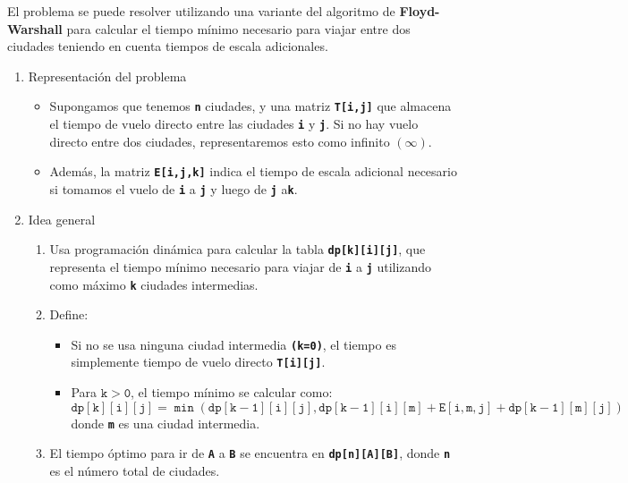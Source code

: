 \begin{enumerate}[label=\color{red}\textbf{\arabic*)}]
\begin{enumerate}[label=\color{red}\alph*)]
        El problema se puede resolver utilizando una variante del algoritmo de \textbf{Floyd-Warshall} para calcular el tiempo mínimo necesario para viajar entre dos ciudades teniendo en cuenta tiempos de escala adicionales.
        \begin{enumerate}[label=\arabic*)]
          \item Representación del problema
            \begin{itemize}[label=\textbullet]
              \item Supongamos que tenemos  \textbf{\texttt{n}} ciudades, y una matriz \textbf{\texttt{T[i,j]}} que almacena el tiempo de vuelo directo entre las ciudades \textbf{\texttt{i}} y \textbf{\texttt{j}}. Si no hay vuelo directo entre dos ciudades, representaremos esto como infinito $(\infty)$.
              \item Además, la matriz \textbf{\texttt{E[i,j,k]}} indica el tiempo de escala adicional necesario si tomamos el vuelo de \textbf{\texttt{i}} a \textbf{\texttt{j}} y luego de \textbf{\texttt{j}} a\textbf{\texttt{k}}.
            \end{itemize}
          \item Idea general
            \begin{enumerate}[label=\arabic*)]
              \item Usa programación dinámica para calcular la tabla \textbf{\texttt{dp[k][i][j]}}, que representa el tiempo mínimo necesario para viajar de \textbf{\texttt{i}} a \textbf{\texttt{j}} utilizando como máximo \textbf{\texttt{k}} ciudades intermedias.
              \item Define:
                \begin{itemize}[label=\textbullet]
                  \item Si no se usa ninguna ciudad intermedia  \textbf{\texttt{(k=0)}}, el tiempo es simplemente tiempo de vuelo directo \textbf{\texttt{T[i][j]}}.
                  \item Para $\mathbf{\mathtt{k>0}}$, el tiempo mínimo se calcular como:
                    \[
                      \mathbf{\mathtt{dp[k][i][j]=\min(dp[k-1][i][j], dp[k-1][i][m]+E[i,m,j]+dp[k-1][m][j])}}
                    \] donde \textbf{\texttt{m}} es una ciudad intermedia.
                \end{itemize}
              \item El tiempo óptimo para ir de \textbf{\texttt{A}} a \textbf{\texttt{B}} se encuentra en \textbf{\texttt{dp[n][A][B]}}, donde \textbf{\texttt{n}} es el número total de ciudades.

\end{enumerate}
\end{enumerate}
\end{enumerate}
\end{enumerate}
